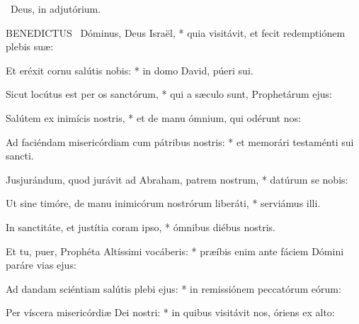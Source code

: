 

\V\ Deus, in adjutórium.









\lettrine[lines=2]{B}{ENEDICTUS} \textdagger\ Dóminus, Deus Israël, * quia visitávit, et fecit redemptiónem plebis suæ:

Et eréxit cornu salútis nobis: * in domo David, púeri sui.

Sicut locútus est per os sanctórum, * qui a sæculo sunt, Prophetárum ejus:

Salútem ex inimícis nostris, * et de manu ómnium, qui odérunt nos:

Ad faciéndam misericórdiam cum pátribus nostris: * et memorári testaménti sui sancti.

Jusjurándum, quod jurávit ad Abraham, patrem nostrum, * datúrum se nobis:

Ut sine timóre, de manu inimicórum nostrórum liberáti, * serviámus illi.

In sanctitáte, et justítia coram ipso, * ómnibus diébus nostris.

Et tu, puer, Prophéta Altíssimi vocáberis: * præíbis enim ante fáciem Dómini paráre vias ejus:

Ad dandam sciéntiam salútis plebi ejus: * in remissiónem peccatórum eórum:

Per víscera misericórdiæ Dei nostri: * in quibus visitávit nos, óriens ex alto:

